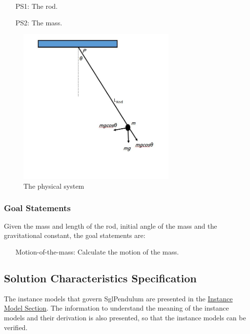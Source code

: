\documentclass[12pt]{article}
\begin{document}
\begin{itemize}
\item[PS1:]{The rod.}
\item[PS2:]{The mass.}
\end{itemize}
\begin{figure}
\begin{center}
\includegraphics[width=0.7\textwidth]{../../../datafiles/SglPendulum/pendulum.jpg}
\caption{The physical system}
\label{Figure:pendulum}
\end{center}
\end{figure}
\subsubsection{Goal Statements}
\label{Sec:GoalStmt}
Given the mass and length of the rod, initial angle of the mass and the gravitational constant, the goal statements are:

\begin{itemize}
\item[Motion-of-the-mass:\phantomsection\label{motionMass}]{Calculate the motion of the mass.}
\end{itemize}
\subsection{Solution Characteristics Specification}
\label{Sec:SolCharSpec}
The instance models that govern SglPendulum are presented in the \hyperref[Sec:IMs]{Instance Model Section}. The information to understand the meaning of the instance models and their derivation is also presented, so that the instance models can be verified.
\end{document}
